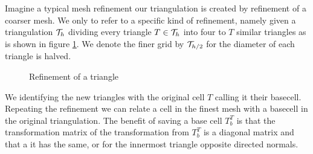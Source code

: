 Imagine a typical mesh refinement our triangulation is created by refinement of a coarser mesh. We only to refer to a specific kind of refinement, namely given a triangulation $\mathcal{T}_h$ dividing every triangle $T \in \mathcal{T}_h$ into four to $T$ similar triangles as is shown in figure \ref{pic: refinement}. We denote the finer grid by $\mathcal{T}_{h/2}$ for the diameter of each triangle is halved.

\begin{figure}[h]

\caption{Refinement of a triangle}
 \label{pic: refinement}
\end{figure}

We identifying the new triangles with the original cell $T$ calling it their basecell. Repeating the refinement we can relate a cell in the finest mesh with a basecell in the original triangulation.
The benefit of saving a base cell $T^T_b$ is that the transformation matrix of the transformation from $T^T_b$ is a diagonal matrix and that a it has the same, or for the innermost triangle opposite directed normals.

